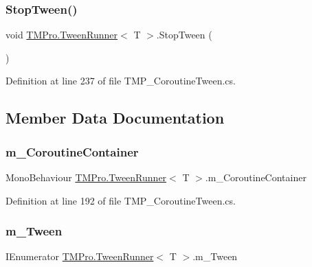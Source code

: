 \subsubsection{\texorpdfstring{StopTween()}{StopTween()}}
{\footnotesize\ttfamily void \mbox{\hyperlink{class_t_m_pro_1_1_tween_runner}{T\+M\+Pro.\+Tween\+Runner}}$<$ T $>$.Stop\+Tween (\begin{DoxyParamCaption}{ }\end{DoxyParamCaption})}



Definition at line 237 of file T\+M\+P\+\_\+\+Coroutine\+Tween.\+cs.



\subsection{Member Data Documentation}
\mbox{\label{class_t_m_pro_1_1_tween_runner_a7dc1ce8abefe863ae28aa4f99568c4ab}} 
\subsubsection{\texorpdfstring{m\_CoroutineContainer}{m\_CoroutineContainer}}
{\footnotesize\ttfamily Mono\+Behaviour \mbox{\hyperlink{class_t_m_pro_1_1_tween_runner}{T\+M\+Pro.\+Tween\+Runner}}$<$ T $>$.m\+\_\+\+Coroutine\+Container\hspace{0.3cm}{\ttfamily [protected]}}



Definition at line 192 of file T\+M\+P\+\_\+\+Coroutine\+Tween.\+cs.

\mbox{\label{class_t_m_pro_1_1_tween_runner_a74047a063eeebdbf3c571976dfb944e0}} 
\subsubsection{\texorpdfstring{m\_Tween}{m\_Tween}}
{\footnotesize\ttfamily I\+Enumerator \mbox{\hyperlink{class_t_m_pro_1_1_tween_runner}{T\+M\+Pro.\+Tween\+Runner}}$<$ T $>$.m\+\_\+\+Tween\hspace{0.3cm}{\ttfamily [protected]}}



